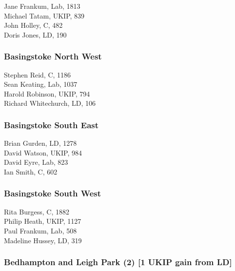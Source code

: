 \documentclass[a4paper,openany,10pt]{book}
\begin{document}


Jane Frankum, Lab, 1813\\
Michael Tatam, UKIP, 839\\
John Holley, C, 482\\
Doris Jones, LD, 190\\


\subsubsection*{Basingstoke North West}



Stephen Reid, C, 1186\\
Sean Keating, Lab, 1037\\
Harold Robinson, UKIP, 794\\
Richard Whitechurch, LD, 106\\


\subsubsection*{Basingstoke South East}



Brian Gurden, LD, 1278\\
David Watson, UKIP, 984\\
David Eyre, Lab, 823\\
Ian Smith, C, 602\\


\subsubsection*{Basingstoke South West}



Rita Burgess, C, 1882\\
Philip Heath, UKIP, 1127\\
Paul Frankum, Lab, 508\\
Madeline Hussey, LD, 319\\


\subsubsection*{Bedhampton and Leigh Park (2) \hspace*{\fill}\nolinebreak[1]%
\enspace\hspace*{\fill}
[1 UKIP gain from LD]}
\end{document}

